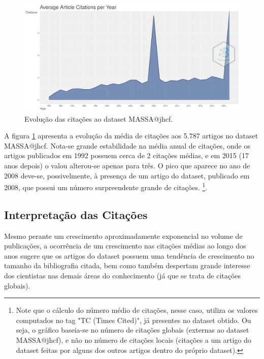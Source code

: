 \begin{figure}
    \centering
    \includegraphics[width=1\textwidth]{experiments/jhcf/PesqBibliogr/SimulacaoMultiagente/WoS-20210803/classico-mais-citacoes/Dataset/AverageArticleCitationPerYear-2021-08-09.png}
    \caption{Evolução das citações ao dataset MASSA@jhcf.}
    \label{fig:evol:anual:citacoes:MASSA@jhcf}
\end{figure}

A figura \ref{fig:evol:anual:citacoes:MASSA@jhcf} apresenta a evolução da média de citações aos 5.787 artigos no dataset MASSA@jhcf. 
Nota-se grande estabilidade na média anual de citações, onde os artigos publicados em 1992 possuem cerca de 2 citações médias, e em 2015 (17 anos depois) o valou alterou-se apenas para três. O pico que aparece no ano de 2008 deve-se, possivelmente, à presença de um artigo do dataset, publicado em 2008, que possui um número surpreendente grande de citações. \footnote{Note que o cálculo do número  médio de citações, nesse caso, utiliza os valores computados no tag "TC (Times Cited)", já presentes no dataset obtido. Ou seja, o gráfico baseia-se no número de citações globais (externas ao dataset MASSA@jhcf), e não no número de citações locais (citações a um artigo do dataset feitas por alguns dos outros artigos dentro do próprio dataset).}.

\subsection{Interpretação das Citações}
Mesmo perante um crescimento aproximadamente exponencial no volume de publicações, a ocorrência de um crescimento nas citações médias ao longo dos anos sugere que os artigos do dataset possuem uma tendência de crescimento no tamanho da bibliografia citada, bem como também despertam grande interesse dos cientistas nas demais áreas do conhecimento (já que se trata de citações globais).

